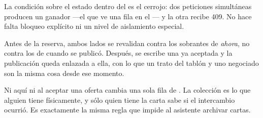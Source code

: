 La condición sobre el estado dentro del  es el cerrojo: dos
peticiones simultáneas producen un ganador —el que ve una fila en el
— y la otra recibe 409. No hace falta bloqueo explícito ni un
nivel de aislamiento especial.

Antes de la reserva, ambos lados se revalidan contra los sobrantes de
\emph{ahora}, no contra los de cuando se publicó. Después, se escribe una
 ya aceptada y la publicación queda enlazada a ella, con lo
que un trato del tablón y uno negociado son la misma cosa desde ese momento.

\begin{pkdecision}
Ni aquí ni al aceptar una oferta cambia una sola fila de .
La colección es lo que alguien tiene físicamente, y sólo quien tiene la carta
sabe si el intercambio ocurrió. Es exactamente la misma regla que impide al
asistente archivar cartas.
\end{pkdecision}
